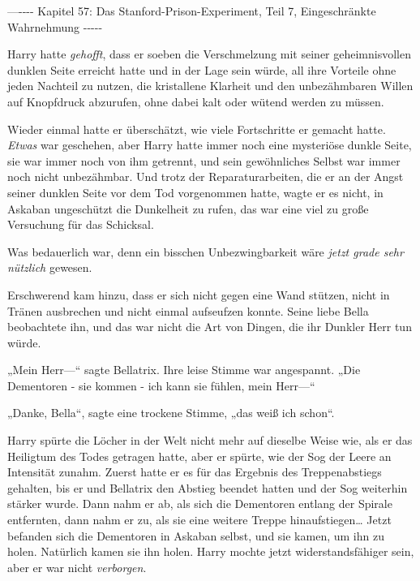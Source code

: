 

\hypertarget{das-stanford-prison-experiment-teil-7-eingeschruxe4nkte-wahrnehmung}{%

—\/-\/-\/-\/- Kapitel 57: Das Stanford-Prison-Experiment, Teil 7, Eingeschränkte Wahrnehmung -\/-\/-\/-\/-

Harry hatte \emph{gehofft}, dass er soeben die Verschmelzung mit seiner geheimnisvollen dunklen Seite erreicht hatte und in der Lage sein würde, all ihre Vorteile ohne jeden Nachteil zu nutzen, die kristallene Klarheit und den unbezähmbaren Willen auf Knopfdruck abzurufen, ohne dabei kalt oder wütend werden zu müssen.

Wieder einmal hatte er überschätzt, wie viele Fortschritte er gemacht hatte. \emph{Etwas} war geschehen, aber Harry hatte immer noch eine mysteriöse dunkle Seite, sie war immer noch von ihm getrennt, und sein gewöhnliches Selbst war immer noch nicht unbezähmbar. Und trotz der Reparaturarbeiten, die er an der Angst seiner dunklen Seite vor dem Tod vorgenommen hatte, wagte er es nicht, in Askaban ungeschützt die Dunkelheit zu rufen, das war eine viel zu große Versuchung für das Schicksal.

Was bedauerlich war, denn ein bisschen Unbezwingbarkeit wäre \emph{jetzt grade sehr nützlich} gewesen.

Erschwerend kam hinzu, dass er sich nicht gegen eine Wand stützen, nicht in Tränen ausbrechen und nicht einmal aufseufzen konnte. Seine liebe Bella beobachtete ihn, und das war nicht die Art von Dingen, die ihr Dunkler Herr tun würde.

„Mein Herr—“ sagte Bellatrix. Ihre leise Stimme war angespannt. „Die Dementoren - sie kommen - ich kann sie fühlen, mein Herr—“

„Danke, Bella“, sagte eine trockene Stimme, „das weiß ich schon“.

Harry spürte die Löcher in der Welt nicht mehr auf dieselbe Weise wie, als er das Heiligtum des Todes getragen hatte, aber er spürte, wie der Sog der Leere an Intensität zunahm. Zuerst hatte er es für das Ergebnis des Treppenabstiegs gehalten, bis er und Bellatrix den Abstieg beendet hatten und der Sog weiterhin stärker wurde. Dann nahm er ab, als sich die Dementoren entlang der Spirale entfernten, dann nahm er zu, als sie eine weitere Treppe hinaufstiegen… Jetzt befanden sich die Dementoren in Askaban selbst, und sie kamen, um ihn zu holen. Natürlich kamen sie ihn holen. Harry mochte jetzt widerstandsfähiger sein, aber er war nicht \emph{verborgen}.

}
